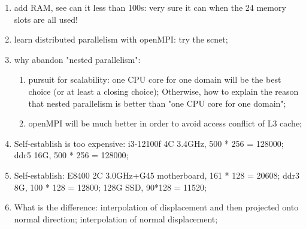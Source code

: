 \begin{enumerate}[label=$\blacksquare$]
\item add RAM, see can it less than 100s: very sure it can when the 24 memory slots are all used!
\item learn distributed parallelism with openMPI: try the scnet;
\item why abandon "nested parallelism":
  \begin{enumerate}[label=$\bullet$]
  \item pursuit for scalability: one CPU core for one domain will be the best choice (or at least a closing choice); Otherwise, how to explain the reason that nested parallelism is better than "one CPU core for one domain";
  \item openMPI will be much better in order to avoid access conflict of L3 cache;
  \end{enumerate}
\item Self-establish is too expensive: i3-12100f 4C 3.4GHz, 500 * 256 = 128000; ddr5 16G, 500 * 256 = 128000;
\item Self-establish: E8400 2C 3.0GHz+G45 motherboard, 161 * 128 = 20608; ddr3 8G, 100 * 128 = 12800; 128G SSD, 90*128 = 11520; 
\item What is the difference: interpolation of displacement and then projected onto normal direction; interpolation of normal displacement;
\end{enumerate}


